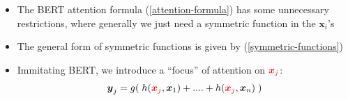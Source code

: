 \documentclass[16pt]{beamer}
\newcommand{\cc}[2]{#1}
\newcommand{\cc}[2]{#2}
\newcommand{\vect}[1]{\boldsymbol{#1}}
\begin{document}
\begin{frame}
\frametitle{\cc{}{An improvement of BERT}}
\begin{itemize}
	\item The BERT attention formula (\ref{attention-formula}) has some unnecessary restrictions, where generally we just need a symmetric function in the $\vect{x}_i$'s
	
	\item The general form of symmetric functions is given by (\ref{symmetric-functions})
	
	\item Immitating BERT, we introduce a ``focus'' of attention on ${\color{red}\vect{x}_j}$:
	\begin{equation}
	\vect{y}_j = g( \; h({\color{red}\vect{x}_j}, \vect{x}_1) + .... + h({\color{red}\vect{x}_j}, \vect{x}_n) \; )
	\end{equation}
	

\end{itemize}
\end{frame}
\end{document}
